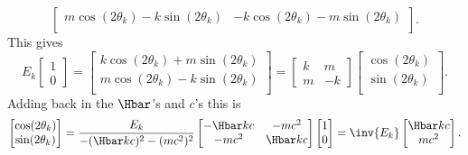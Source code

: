 {\begin{dmath}
\begin{bmatrix}
m \cos(2 \theta_k) - k \sin(2 \theta_k) & -k \cos(2 \theta_k) - m \sin(2 \theta_k) \\
\end{bmatrix}.
\end{dmath}
%
This gives
%
\begin{dmath}\label{eqn:qmLecture9Problems:320}
E_k
\begin{bmatrix}
1 \\
0
\end{bmatrix}
=
\begin{bmatrix}
k \cos(2 \theta_k) + m \sin(2 \theta_k) \\
m \cos(2 \theta_k) - k \sin(2 \theta_k) \\
\end{bmatrix}
=
\begin{bmatrix}
k & m \\
m & -k
\end{bmatrix}
\begin{bmatrix}
\cos(2 \theta_k) \\
\sin(2 \theta_k) \\
\end{bmatrix}.
\end{dmath}
%
Adding back in the \(\Hbar\)'s and \(c\)'s this is
%
\begin{dmath}\label{eqn:qmLecture9Problems:340}
\begin{bmatrix}
\cos(2 \theta_k) \\
\sin(2 \theta_k) \\
\end{bmatrix}
=
\frac{E_k}{-(\Hbar k c)^2 -(m c^2)^2}
\begin{bmatrix}
- \Hbar k c & - m c^2 \\
- m c^2     & \Hbar k c
\end{bmatrix}
\begin{bmatrix}
1 \\
0
\end{bmatrix}
=
\inv{E_k}
\begin{bmatrix}
\Hbar k c \\
m c^2
\end{bmatrix}.
\end{dmath}
%
%
%
}
